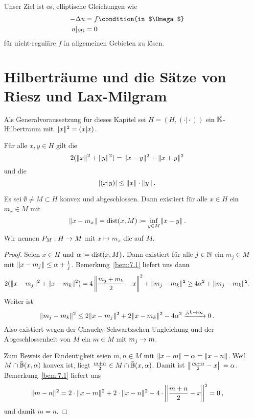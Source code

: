 

Unser Ziel ist es, elliptische Gleichungen wie
\begin{align*}
    -\Delta u&=f\condition{in $\Omega$} \\
    u\vert_{\partial\Omega}&=0
\end{align*}
für nicht-reguläre $f$ in allgemeinen Gebieten zu lösen.

\section{Hilberträume und die Sätze von Riesz und Lax-Milgram}

Als Generalvoraussetzung für dieses Kapitel sei $H=(H,(\cdot\vert\cdot))$ ein $\mathbb{K}$-Hilbert\-raum mit $\lVert x\rVert^2=(x\vert x)$.

\begin{bem}
  \label{bem:7.1} Für alle $x,y\in H$ gilt die 
  \[ 2(\lVert x\rVert^2+\lVert y\rVert^2)=\lVert x-y\rVert^2+\lVert x+y\rVert^2 \]
  und die 
  \[ \lvert (x\vert y)\rvert\leq\lVert x\rVert\cdot\lVert y\rVert \, . \]
\end{bem}

\begin{satz}[Approximationssatz]
  \label{satz:7.2} Es sei $\emptyset\neq M\subset H$ konvex und abgeschlossen. Dann existiert für alle $x\in H$ ein $m_x\in M$ mit
  \[ \lVert x-m_x\rVert=\operatorname{dist}(x,M)\coloneqq \inf_{y\in M}\lVert x-y\rVert\, .  \]
  Wir nennen $P_M:H\rightarrow M$ mit $x\mapsto m_x$ die  auf $M$.
\end{satz}

\begin{proof}
  Seien $x\in H$ und $\alpha\coloneqq\operatorname{dist}(x,M)$. Dann existiert für alle $j\in\mathbb{N}$ ein $m_j\in M$ mit $\lVert x-m_j\rVert\leq\alpha+\frac 1j$. Bemerkung~\ref{bem:7.1} liefert uns dann
  \begin{dmath*}
    2(\norm{x-m_j}^2+\norm{x-m_k}^2)=4\Norm{\frac{m_j+m_k}2-x}^2+\norm{m_j-m_k}^2
    \geq4\alpha^2+\norm{m_j-m_k}^2.
  \end{dmath*}
  Weiter ist
  \[ \lVert m_j-m_k\rVert^2\leq2\lVert x-m_j\rVert^2+2\lVert x-m_k\rVert^2-4\alpha^2\xrightarrow{j,k\rightarrow\infty}0\, . \]
  Also existiert wegen der Chauchy-Schwartzschen Ungleichung und der Abgeschlossenheit von $M$ ein $m\in M$ mit $m_j\rightarrow m$.

  Zum Beweis der Eindeutigkeit seien $m,n\in M$ mit $\lVert x-m\rVert=\alpha=\lVert x-n\rVert$. Weil $M\cap\bar{\mathbb{B}}(x,\alpha)$ konvex ist, liegt $\frac{m+n}2 \in M\cap\bar{\mathbb{B}}(x,\alpha)$. Damit ist $\left\lVert \frac{m+n}2-x\right\rVert=\alpha$. Bemerkung~\ref{bem:7.1} liefert uns
\[
    \lVert m-n\rVert^2=2\cdot\lVert x-m\rVert^2+2\cdot\lVert x-n\rVert^2-4\cdot\left\lVert \frac{m+n}2-x\right\rVert^2=0\, ,
 \]
  und damit $m=n$.
\end{proof}

